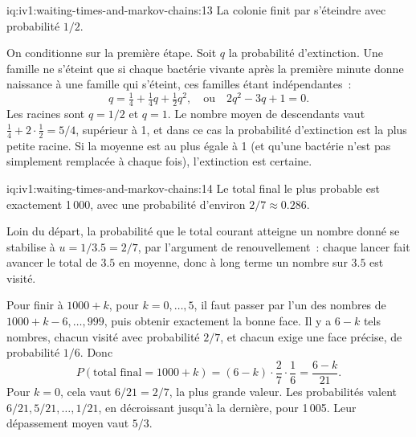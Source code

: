 \begin{solution}{iq:iv1:waiting-times-and-markov-chains:13}
La colonie finit par s'éteindre avec probabilité $1/2$.

On conditionne sur la première étape. Soit $q$ la probabilité d'extinction. Une famille ne s'éteint que si chaque bactérie vivante après la première minute donne naissance à une famille qui s'éteint, ces familles étant indépendantes~:
\[
q = \tfrac14 + \tfrac14 q + \tfrac12 q^2, \quad\text{ou}\quad 2q^2 - 3q + 1 = 0.
\]
Les racines sont $q = 1/2$ et $q = 1$. Le nombre moyen de descendants vaut $\tfrac14 + 2 \cdot \tfrac12 = 5/4$, supérieur à 1, et dans ce cas la probabilité d'extinction est la plus petite racine. Si la moyenne est au plus égale à 1 (et qu'une bactérie n'est pas simplement remplacée à chaque fois), l'extinction est certaine.

\end{solution}

\begin{solution}{iq:iv1:waiting-times-and-markov-chains:14}
Le total final le plus probable est exactement 1\,000, avec une probabilité d'environ $2/7 \approx 0.286$.

Loin du départ, la probabilité que le total courant atteigne un nombre donné se stabilise à $u = 1/3.5 = 2/7$, par l'argument de renouvellement~: chaque lancer fait avancer le total de $3.5$ en moyenne, donc à long terme un nombre sur $3.5$ est visité.

Pour finir à $1000 + k$, pour $k = 0, \dots, 5$, il faut passer par l'un des nombres de $1000 + k - 6, \dots, 999$, puis obtenir exactement la bonne face. Il y a $6 - k$ tels nombres, chacun visité avec probabilité $2/7$, et chacun exige une face précise, de probabilité $1/6$. Donc
\[
P(\text{total final} = 1000 + k) = (6 - k) \cdot \frac27 \cdot \frac16 = \frac{6 - k}{21}.
\]
Pour $k = 0$, cela vaut $6/21 = 2/7$, la plus grande valeur. Les probabilités valent $6/21, 5/21, \dots, 1/21$, en décroissant jusqu'à la dernière, pour 1\,005. Leur dépassement moyen vaut $5/3$.

\end{solution}

